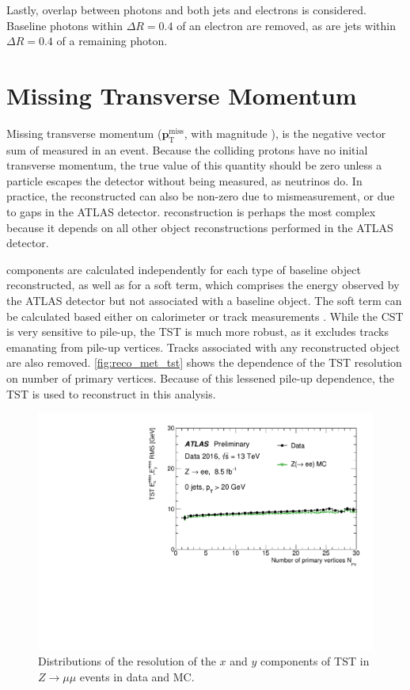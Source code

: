 Lastly, overlap between photons and both jets and electrons is considered. Baseline photons within $\Delta R = 0.4$ of an electron are removed, as are jets within $\Delta R = 0.4$ of a remaining photon.

\section{Missing Transverse Momentum}
\label{sec:reco_met}

Missing transverse momentum (${\boldsymbol p}_{\mathrm{T}}^\mathrm{miss}$, with magnitude \met), is the negative vector sum of \pt measured in an event. Because the colliding protons have no initial transverse momentum, the true value of this quantity should be zero unless a particle escapes the detector without being measured, as neutrinos do. In practice, the reconstructed \met can also be non-zero due to mismeasurement, or due to gaps in the \ac{ATLAS} detector. \met reconstruction is perhaps the most complex because it depends on all other object reconstructions performed in the \ac{ATLAS} detector. 

\met components are calculated independently for each type of baseline object reconstructed, as well as for a soft term, which comprises the energy observed by the \ac{ATLAS} detector but not associated with a baseline object. The soft term can be calculated based either on calorimeter or track measurements \cite{ATL-PHYS-PUB-2015-023}. While the \acf{CST} is very sensitive to pile-up, the \acf{TST} is much more robust, as it excludes tracks emanating from pile-up vertices. Tracks associated with any reconstructed object are also removed. \autoref{fig:reco_met_tst} shows the dependence of the \ac{TST} resolution on number of primary vertices. Because of this lessened pile-up dependence, the \ac{TST} is used to reconstruct \met in this analysis. 

\begin{centering}
\begin{figure}[!hbt]
\myfloatalign
\includegraphics[width=.9\linewidth]{figures/reco/mettst.pdf}
\caption{ Distributions of the resolution of the $x$ and $y$ components of \ac{TST} \met in $Z\rightarrow\mu\mu$ events in data and \ac{MC}. }
\label{fig:reco_met_tst}
\end{figure}
\end{centering}

